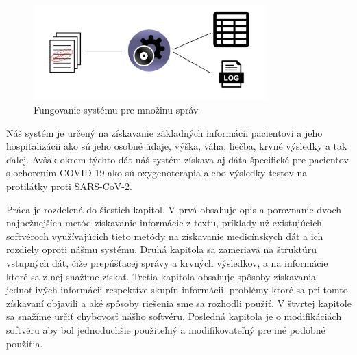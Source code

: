 \begin{figure}
	\centerline{\includegraphics[width=0.8\textwidth]{images/system_viac_sprav}}
	\caption[Fungovanie systému pre množinu správ]{Fungovanie systému pre množinu správ}
	\label{obr:systemJedna}
\end{figure}

Náš systém je určený na získavanie základných informácii pacientovi a jeho hospitalizácii ako sú jeho osobné údaje, výška, váha, liečba, krvné výsledky a tak ďalej. Avšak okrem týchto dát náš systém získava aj dáta špecifické pre pacientov s ochorením COVID-19 ako sú oxygenoterapia alebo výsledky testov na protilátky proti SARS-CoV-2.

Práca je rozdelená do šiestich kapitol. V prvá obsahuje opis a  porovnanie dvoch najbežnejších metód získavanie informácie z textu, príklady už existujúcich softvéroch využívajúcich tieto metódy na získavanie medicínskych dát a ich rozdiely oproti nášmu systému. Druhá kapitola sa zameriava na štruktúru vstupných dát, čiže prepúšťacej správy a krvných výsledkov, a na informácie ktoré sa z nej snažíme získať. Tretia kapitola obsahuje spôsoby získavania jednotlivých informácii respektíve skupín informácii, problémy ktoré sa pri tomto získavaní objavili a aké spôsoby riešenia sme sa rozhodli použiť. V štvrtej kapitole sa snažíme určiť chybovosť nášho softvéru.  Posledná kapitola je o modifikáciách softvéru aby bol jednoduchšie použiteľný a modifikovateľný pre iné podobné použitia.



